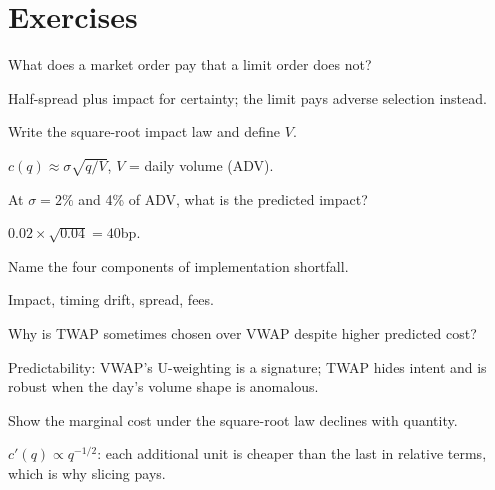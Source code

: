 \section{Exercises}
\begin{exercise}[easy]
What does a market order pay that a limit order does not?
\end{exercise}
\begin{solution}
Half-spread plus impact for certainty; the limit pays adverse selection instead.
\end{solution}

\begin{exercise}[easy]
Write the square-root impact law and define $V$.
\end{exercise}
\begin{solution}
$c(q)\approx\sigma\sqrt{q/V}$, $V$ = daily volume (ADV).
\end{solution}

\begin{exercise}[easy]
At $\sigma=2\%$ and 4\% of ADV, what is the predicted impact?
\end{exercise}
\begin{solution}
$0.02\times\sqrt{0.04}=40$bp.
\end{solution}

\begin{exercise}[easy]
Name the four components of implementation shortfall.
\end{exercise}
\begin{solution}
Impact, timing drift, spread, fees.
\end{solution}

\begin{exercise}[easy]
Why is TWAP sometimes chosen over VWAP despite higher predicted cost?
\end{exercise}
\begin{solution}
Predictability: VWAP's U-weighting is a signature; TWAP hides intent and is robust when
the day's volume shape is anomalous.
\end{solution}

\begin{exercise}
Show the marginal cost under the square-root law declines with quantity.
\end{exercise}
\begin{solution}
$c'(q)\propto q^{-1/2}$: each additional unit is cheaper than the last in relative terms,
which is why slicing pays.
\end{solution}

